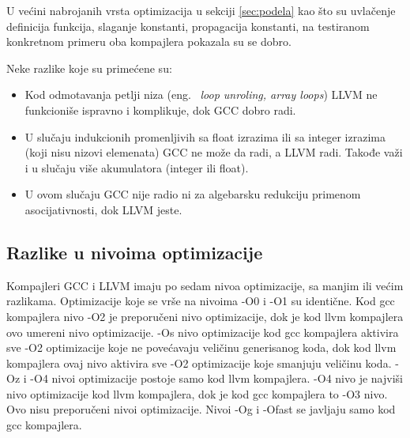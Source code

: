 \documentclass[a4paper]{article}
\begin{document}
U većini nabrojanih  vrsta optimizacija u sekciji \ref{sec:podela} kao što su uvlačenje definicija funkcija, slaganje konstanti, propagacija konstanti, na testiranom konkretnom primeru oba kompajlera pokazala su se dobro.

Neke razlike koje su primećene su: 
\begin{itemize}
\item Kod odmotavanja petlji niza (eng. ~{\em loop unroling, array loops}) LLVM ne funkcioniše ispravno i komplikuje, dok GCC dobro radi. 
\item U slučaju indukcionih promenljivih sa float izrazima  ili sa integer izrazima (koji nisu nizovi elemenata) GCC ne može da radi, a LLVM radi. Takođe važi i u slučaju više akumulatora (integer ili float).
\item U ovom slučaju GCC nije radio ni za algebarsku redukciju primenom asocijativnosti, dok LLVM jeste. \cite{fogOptimizacije}
\end{itemize}

\subsection{Razlike u nivoima optimizacije}
\label{subsec:nivoiRazlika}
Kompajleri GCC i LLVM imaju po sedam nivoa optimizacije, sa manjim ili većim razlikama. 
Optimizacije koje se vrše na nivoima -O0 i -O1 su identične. Kod gcc kompajlera nivo -O2 je preporučeni nivo optimizacije, dok je kod llvm kompajlera ovo umereni nivo optimizacije. -Os nivo optimizacije kod gcc kompajlera aktivira sve -O2 optimizacije koje ne povećavaju veličinu generisanog koda, dok kod llvm kompajlera ovaj nivo aktivira sve -O2 optimizacije koje smanjuju veličinu koda. -Oz i -O4 nivoi optimizacije postoje samo kod llvm kompajlera. -O4 nivo je najviši nivo optimizacije kod llvm kompajlera, dok je kod gcc kompajlera to -O3 nivo. Ovo nisu preporučeni nivoi optimizacije. Nivoi -Og i -Ofast se javljaju samo kod gcc kompajlera.
\\
\end{document}
